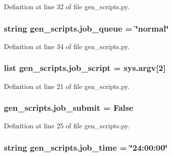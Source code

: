 Definition at line 32 of file gen\+\_\+scripts.\+py.

\hypertarget{namespacegen__scripts_a1dbb111ede2a7f1c6b488fe346fb728c}{
\subsubsection[{job\+\_\+queue}]{\setlength{\rightskip}{0pt plus 5cm}string gen\+\_\+scripts.\+job\+\_\+queue = \char`\"{}normal\char`\"{}}}\label{namespacegen__scripts_a1dbb111ede2a7f1c6b488fe346fb728c}


Definition at line 34 of file gen\+\_\+scripts.\+py.

\hypertarget{namespacegen__scripts_a12678ff7a3d593bd7cf47174be709f45}{
\subsubsection[{job\+\_\+script}]{\setlength{\rightskip}{0pt plus 5cm}list gen\+\_\+scripts.\+job\+\_\+script = sys.\+argv\mbox{[}2\mbox{]}}}\label{namespacegen__scripts_a12678ff7a3d593bd7cf47174be709f45}


Definition at line 21 of file gen\+\_\+scripts.\+py.

\hypertarget{namespacegen__scripts_a2a14c2baae124bbad677a6ad3ce1a30c}{
\subsubsection[{job\+\_\+submit}]{\setlength{\rightskip}{0pt plus 5cm}gen\+\_\+scripts.\+job\+\_\+submit = False}}\label{namespacegen__scripts_a2a14c2baae124bbad677a6ad3ce1a30c}


Definition at line 25 of file gen\+\_\+scripts.\+py.

\hypertarget{namespacegen__scripts_a1ef862b04e26c1258b9278e3cf1f80b3}{
\subsubsection[{job\+\_\+time}]{\setlength{\rightskip}{0pt plus 5cm}string gen\+\_\+scripts.\+job\+\_\+time = \char`\"{}24\+:00\+:00\char`\"{}}}\label{namespacegen__scripts_a1ef862b04e26c1258b9278e3cf1f80b3}


